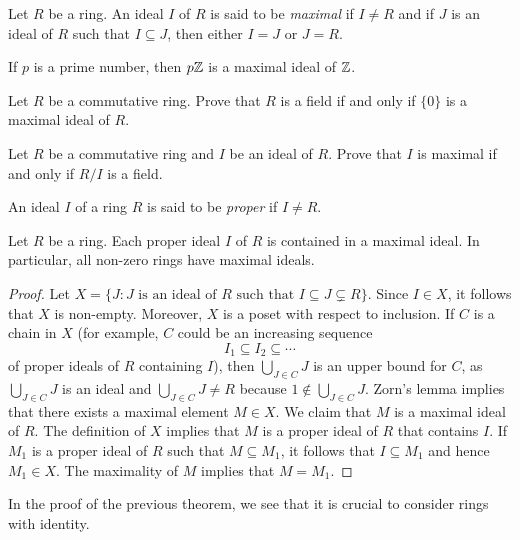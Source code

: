 \begin{definition}
	Let $R$ be a ring. An ideal $I$ of $R$ is said to be \emph{maximal}
	if $I\ne R$ and if $J$ is an ideal of $R$ such that $I\subseteq J$, then 
	either $I=J$ or $J=R$. 
\end{definition}

If $p$ is a prime number, then $p\mathbb{Z}$ is a maximal ideal of $\mathbb{Z}$.

\begin{exercise}
Let $R$ be a commutative ring. Prove that $R$ is a 
field if and only if $\{0\}$ is a maximal ideal of $R$. 	
\end{exercise}

\begin{exercise}
\label{xca:maximal<=>field}
Let $R$ be a commutative ring and $I$ be an ideal of $R$. Prove that $I$ is maximal
if and only if $R/I$ is a field.  	
\end{exercise}

An ideal $I$ of a ring $R$ is said to be \emph{proper}
if $I\ne R$. 

\begin{theorem}[Krull]
	Let $R$ be a ring. Each proper ideal $I$ of $R$ 
	is contained in a maximal ideal. 
	In particular, all non-zero rings have maximal ideals. 	
\end{theorem}

\begin{proof}
	Let $X=\{J:J\text{ is an ideal of $R$ such that }I\subseteq J\subsetneq R\}$.
	Since $I\in X$, it follows that $X$ is non-empty. Moreover, $X$ is a poset
	with respect to inclusion. If $C$ is a chain in $X$ (for example, $C$ could be   
	an increasing sequence
	\[
	I_1\subseteq I_2\subseteq\cdots
	\]
  of proper ideals of $R$ containing $I$), then $\bigcup_{J\in C}J$ is an upper
  bound for $C$, as $\bigcup_{J\in C}J$ is an ideal and $\bigcup_{J\in C}J\ne
  R$ because $1\not\in\bigcup_{J\in C}J$. 	Zorn's lemma implies that there
  exists a maximal element $M\in X$. We claim that $M$ is a maximal ideal of
  $R$. The definition of $X$ implies that $M$ is a proper ideal of $R$ that
  contains $I$. If $M_1$ is a proper ideal of $R$ such that $M\subseteq M_1$,
  it follows that $I\subseteq M_1$ and hence $M_1\in X$. The maximality of $M$
  implies that $M=M_1$.  
\end{proof}

In the proof of the previous theorem, we see that it is crucial to consider rings with 
identity. 


